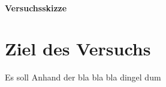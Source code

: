 \documentclass[11pt, A4paper]{article}
\begin{document}
	\maketitle
	\paragraph{Versuchsskizze}
	\newpage
	\section{Ziel des Versuchs}
	\begin{ad}
		Es soll Anhand der bla bla bla dingel dum
	\end{ad}
\end{document}
